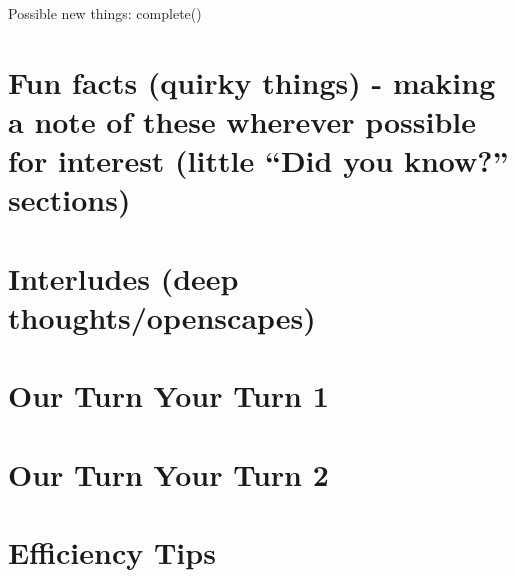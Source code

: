 \documentclass[]{book}
\begin{document}
Possible new things:
complete()

\hypertarget{fun-facts-quirky-things---making-a-note-of-these-wherever-possible-for-interest-little-did-you-know-sections-2}{%
\section{Fun facts (quirky things) - making a note of these wherever possible for interest (little ``Did you know?'' sections)}\label{fun-facts-quirky-things---making-a-note-of-these-wherever-possible-for-interest-little-did-you-know-sections-2}}

\hypertarget{interludes-deep-thoughtsopenscapes-6}{%
\section{Interludes (deep thoughts/openscapes)}\label{interludes-deep-thoughtsopenscapes-6}}

\hypertarget{our-turn-your-turn-1}{%
\section{Our Turn Your Turn 1}\label{our-turn-your-turn-1}}

\hypertarget{our-turn-your-turn-2-1}{%
\section{Our Turn Your Turn 2}\label{our-turn-your-turn-2-1}}

\hypertarget{efficiency-tips-7}{%
\section{Efficiency Tips}\label{efficiency-tips-7}}


\end{document}
